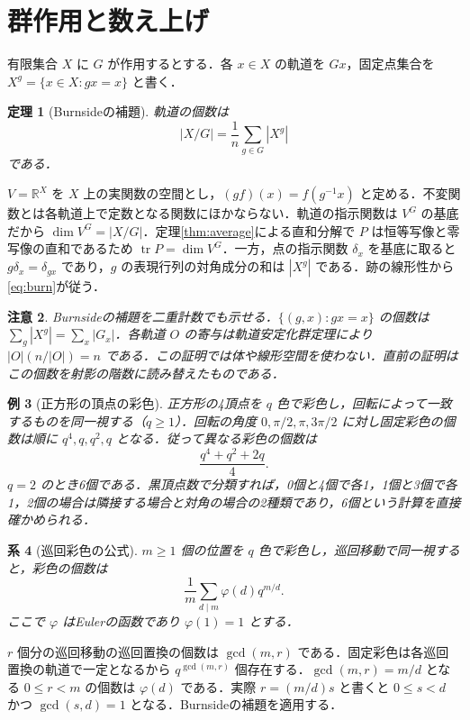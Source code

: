 \documentclass[a5paper,10pt,onecolumn]{jsarticle}
\makeatletter
\theoremstyle{mathnotetheorem}
\newtheorem{theorem}{定理}[section]
\newtheorem{corollary}[theorem]{系}
\newtheorem{example}[theorem]{例}
\newtheorem{remark}[theorem]{注意}
\renewcommand{\proofname}{証明}
\renewenvironment{proof}[1][\proofname]{%
  \par\pushQED{\qed}\normalfont\topsep4\p@\@plus2\p@\relax
  \trivlist\item[\hskip\labelsep\bfseries #1]\ignorespaces
}{\popQED\endtrivlist\@endpefalse}
\newcommand{\R}{\mathbb{R}}
\makeatother
\begin{document}
\section{群作用と数え上げ}
有限集合 $X$ に $G$ が作用するとする．各 $x\in X$ の軌道を $Gx$，固定点集合を $X^g=\{x\in X:gx=x\}$ と書く．
\begin{theorem}[Burnsideの補題]\label{thm:burnside}
軌道の個数は
\begin{equation}\label{eq:burn}
 |X/G|=\frac1n\sum_{g\in G}|X^g|
\end{equation}
である．
\end{theorem}
\begin{proof}
$V=\R^X$ を $X$ 上の実関数の空間とし，$(gf)(x)=f(g^{-1}x)$ と定める．不変関数とは各軌道上で定数となる関数にほかならない．軌道の指示関数は $V^G$ の基底だから $\dim V^G=|X/G|$．定理\ref{thm:average}による直和分解で $P$ は恒等写像と零写像の直和であるため $\operatorname{tr}P=\dim V^G$．一方，点の指示関数 $\delta_x$ を基底に取ると $g\delta_x=\delta_{gx}$ であり，$g$ の表現行列の対角成分の和は $|X^g|$ である．跡の線形性から\eqref{eq:burn}が従う．
\end{proof}
\begin{remark}
Burnsideの補題を二重計数でも示せる．$\{(g,x):gx=x\}$ の個数は $\sum_g|X^g|=\sum_x|G_x|$．各軌道 $O$ の寄与は軌道安定化群定理により $|O|(n/|O|)=n$ である．この証明では体や線形空間を使わない．直前の証明はこの個数を射影の階数に読み替えたものである．
\end{remark}
\begin{example}[正方形の頂点の彩色]
正方形の4頂点を $q$ 色で彩色し，回転によって一致するものを同一視する（$q\ge1$）．回転の角度 $0,\pi/2,\pi,3\pi/2$ に対し固定彩色の個数は順に $q^4,q,q^2,q$ となる．従って異なる彩色の個数は
\[
 \frac{q^4+q^2+2q}{4}.
\]
$q=2$ のとき6個である．黒頂点数で分類すれば，0個と4個で各1，1個と3個で各1，2個の場合は隣接する場合と対角の場合の2種類であり，6個という計算を直接確かめられる．
\end{example}
\begin{corollary}[巡回彩色の公式]
$m\ge1$ 個の位置を $q$ 色で彩色し，巡回移動で同一視すると，彩色の個数は
\[
 \frac1m\sum_{d\mid m}\varphi(d)q^{m/d}.
\]
ここで $\varphi$ はEulerの函数であり $\varphi(1)=1$ とする．
\end{corollary}
\begin{proof}
$r$ 個分の巡回移動の巡回置換の個数は $\gcd(m,r)$ である．固定彩色は各巡回置換の軌道で一定となるから $q^{\gcd(m,r)}$ 個存在する．$\gcd(m,r)=m/d$ となる $0\le r<m$ の個数は $\varphi(d)$ である．実際 $r=(m/d)s$ と書くと $0\le s<d$ かつ $\gcd(s,d)=1$ となる．Burnsideの補題を適用する．
\end{proof}
\end{document}
